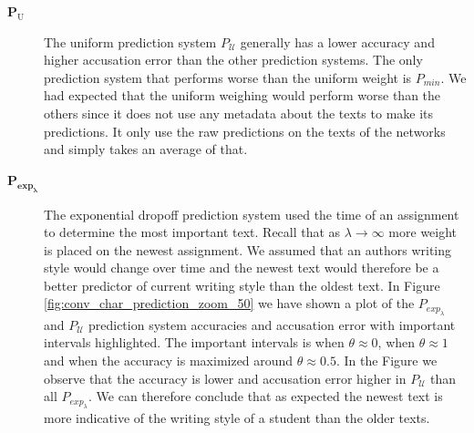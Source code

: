 \begin{description}

    \item[$\mathbf{P_\mathrm{U}}$]

        The uniform prediction system $P_\mathcal{U}$ generally has a lower
        accuracy and higher accusation error than the other prediction systems.
        The only prediction system that performs worse than the uniform weight
        is $P_{min}$. We had expected that the uniform weighing would perform
        worse than the others since it does not use any metadata about the texts
        to make its predictions. It only use the raw predictions on the texts of
        the networks and simply takes an average of that.

    \item[$\mathbf{P_{exp_\lambda}}$]

        The exponential dropoff prediction system used the time of an
        assignment to determine the most important text. Recall that
        as $\lambda \rightarrow \infty$ more weight is placed on the
        newest assignment. We assumed that an authors writing style would
        change over time and the newest text would therefore be a better
        predictor of current writing style than the oldest text. In Figure
        \ref{fig:conv_char_prediction_zoom_50} we have shown a plot of the
        $P_{exp_\lambda}$ and $P_\mathcal{U}$ prediction system accuracies and
        accusation error with important intervals highlighted. The important
        intervals is when $\theta \approx 0$, when $\theta \approx 1$ and when
        the accuracy is maximized around $\theta \approx 0.5$. In the Figure
        we observe that the accuracy is lower and accusation error higher in
        $P_\mathcal{U}$ than all $P_{exp_\lambda}$. We can therefore conclude
        that as expected the newest text is more indicative of the writing style
        of a student than the older texts.


\end{description}
